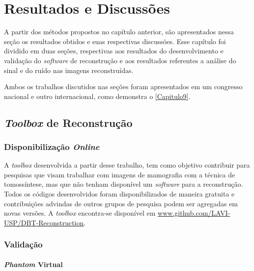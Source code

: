 \chapter[Resultados e Discussões]{Resultados e Discussões}\label{Capitulo6}

A partir dos métodos propostos no capítulo anterior, são apresentados nessa seção os resultados obtidos e suas respectivas discussões. Esse capítulo foi dividido em duas seções, respectivas aos resultados do desenvolvimento e validação do \textit{software} de reconstrução e aos resultados referentes a análise do sinal e do ruído nas imagens reconstruídas. 

Ambos os trabalhos discutidos nas seções foram apresentados em um congresso nacional e outro internacional, como demonstra o \autoref{Capitulo9}. 

\section{\textit{Toolbox} de Reconstrução}

\subsection{Disponibilização \textit{Online}}

 A \textit{toolbox} desenvolvida a partir desse trabalho, tem como objetivo contribuir para pesquisas que visam trabalhar com imagens de mamografia com a técnica de tomossíntese, mas que não tenham disponível um \textit{software} para a reconstrução. Todos os códigos desenvolvidos foram disponibilizados de maneira gratuita e contribuições advindas de outros grupos de pesquisa podem ser agregadas em novas versões. A \textit{toolbox} encontra-se disponível em \url{www.github.com/LAVI-USP/DBT-Reconstruction}. 
 
 \subsection{Validação}
 
 \subsubsection{\textit{Phantom} Virtual}
 

